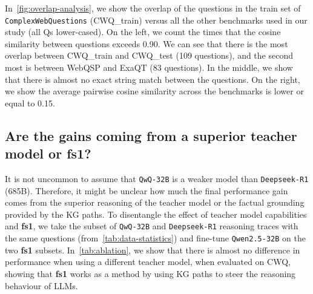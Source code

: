 \documentclass[11pt]{article}
\newcommand{\rone}{\texttt{Deepseek-R1}}
\newcommand{\qwq}{\texttt{QwQ-32B}}
\newcommand{\dataset}{\textbf{fs1}}
\begin{document}
In~\cref{fig:overlap-analysis}, we show the overlap of the questions in the train set of \texttt{ComplexWebQuestions} (CWQ\_train) versus all the other benchmarks used in our study (all Qs lower-cased). On the left, we count the times that the cosine similarity between questions exceeds 0.90. We can see that there is the most overlap between CWQ\_train and CWQ\_test (109 questions), and the second most is between WebQSP and ExaQT (83 questions). In the middle, we show that there is almost no exact string match between the questions. On the right, we show the average pairwise cosine similarity across the benchmarks is lower or equal to 0.15.

\begin{center}
%
\end{center}

\subsection{Are the gains coming from a superior teacher model or \textbf{fs1}?}


It is not uncommon to assume that \qwq{} is a weaker model than \rone{} (685B). Therefore, it might be unclear how much the final performance gain comes from the superior reasoning of the teacher model or the factual grounding provided by the KG paths. To disentangle the effect of teacher model capabilities and \dataset{}, we take the subset of \qwq{} and \rone{} reasoning traces with the same questions (from~\cref{tab:data-statistics}) and fine-tune \texttt{Qwen2.5-32B} on the two \dataset{} subsets. In~\cref{tab:ablation}, we show that there is almost no difference in performance when using a different teacher model, when evaluated on CWQ, showing that \dataset{} works as a method by using KG paths to steer the reasoning behaviour of LLMs.

\begin{center}
%
\end{center}
\end{document}
